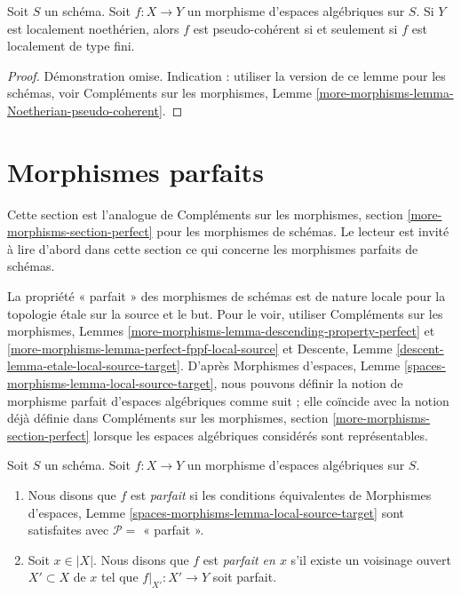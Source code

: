 \begin{lemma}
\label{lemma-Noetherian-pseudo-coherent}
Soit $S$ un schéma. Soit $f : X \to Y$ un morphisme d'espaces algébriques
sur $S$. Si $Y$ est localement noethérien, alors $f$ est pseudo-cohérent si
et seulement si $f$ est localement de type fini.
\end{lemma}

\begin{proof}
Démonstration omise. Indication : utiliser la version de ce lemme pour les schémas, voir
Compléments sur les morphismes,
Lemme \ref{more-morphisms-lemma-Noetherian-pseudo-coherent}.
\end{proof}








\section{Morphismes parfaits}
\label{section-perfect}

\noindent
Cette section est l'analogue de
Compléments sur les morphismes, section \ref{more-morphisms-section-perfect}
pour les morphismes de schémas. Le lecteur est invité à lire d'abord
dans cette section ce qui concerne les morphismes parfaits de schémas.

\medskip\noindent
La propriété « parfait » des morphismes de schémas est
de nature locale pour la topologie étale sur la source et le but. Pour le voir, utiliser
Compléments sur les morphismes,
Lemmes \ref{more-morphisms-lemma-descending-property-perfect} et
\ref{more-morphisms-lemma-perfect-fppf-local-source}
et
Descente, Lemme \ref{descent-lemma-etale-local-source-target}.
D'après
Morphismes d'espaces,
Lemme \ref{spaces-morphisms-lemma-local-source-target},
nous pouvons définir la notion de morphisme parfait d'espaces algébriques comme
suit ; elle coïncide avec la notion déjà définie dans
Compléments sur les morphismes, section \ref{more-morphisms-section-perfect}
lorsque les espaces algébriques considérés sont représentables.

\begin{definition}
\label{definition-perfect}
Soit $S$ un schéma.
Soit $f : X \to Y$ un morphisme d'espaces algébriques sur $S$.
\begin{enumerate}
\item Nous disons que $f$ est {\it parfait} si les conditions équivalentes de
Morphismes d'espaces, Lemme \ref{spaces-morphisms-lemma-local-source-target}
sont satisfaites avec $\mathcal{P} =$ « parfait ».
\item Soit $x \in |X|$. Nous disons que $f$ est {\it parfait en $x$} s'il
existe un voisinage ouvert $X' \subset X$ de $x$ tel
que $f|_{X'} : X' \to Y$ soit parfait.
\end{enumerate}
\end{definition}


